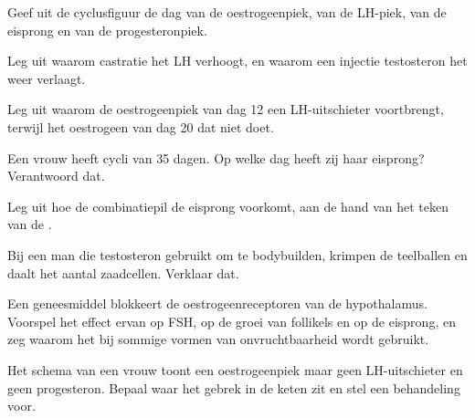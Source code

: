 \begin{exercise}[$\star\star$]\label{exo:g11:hormones-and-reproduction:6}
Geef uit de cyclusfiguur de dag van de oestrogeenpiek, van de LH-piek,
van de eisprong en van de progesteronpiek.
\end{exercise}

\begin{exercise}[$\star\star$]\label{exo:g11:hormones-and-reproduction:7}
Leg uit waarom castratie het LH verhoogt, en waarom een injectie
testosteron het weer verlaagt.
\end{exercise}

\begin{exercise}[$\star\star$]\label{exo:g11:hormones-and-reproduction:8}
Leg uit waarom de oestrogeenpiek van dag 12 een LH-uitschieter
voortbrengt, terwijl het oestrogeen van dag 20 dat niet doet.
\end{exercise}

\begin{exercise}[$\star\star$]\label{exo:g11:hormones-and-reproduction:9}
Een vrouw heeft cycli van 35 dagen. Op welke dag heeft zij haar eisprong?
Verantwoord dat.
\end{exercise}

\begin{exercise}[$\star\star$]\label{exo:g11:hormones-and-reproduction:10}
Leg uit hoe de combinatiepil de eisprong voorkomt, aan de hand van het
teken van de .
\end{exercise}

\begin{exercise}[$\star\star$]\label{exo:g11:hormones-and-reproduction:11}
Bij een man die testosteron gebruikt om te bodybuilden, krimpen de
teelballen en daalt het aantal zaadcellen. Verklaar dat.
\end{exercise}

\begin{exercise}[$\star\star\star$]\label{exo:g11:hormones-and-reproduction:12}
Een geneesmiddel blokkeert de oestrogeenreceptoren van de hypothalamus.
Voorspel het effect ervan op FSH, op de groei van follikels en op de
eisprong, en zeg waarom het bij sommige vormen van onvruchtbaarheid wordt
gebruikt.
\end{exercise}

\begin{exercise}[$\star\star\star$]\label{exo:g11:hormones-and-reproduction:13}
Het schema van een vrouw toont een oestrogeenpiek maar geen
LH-uitschieter en geen progesteron. Bepaal waar het gebrek in de keten
zit en stel een behandeling voor.
\end{exercise}

